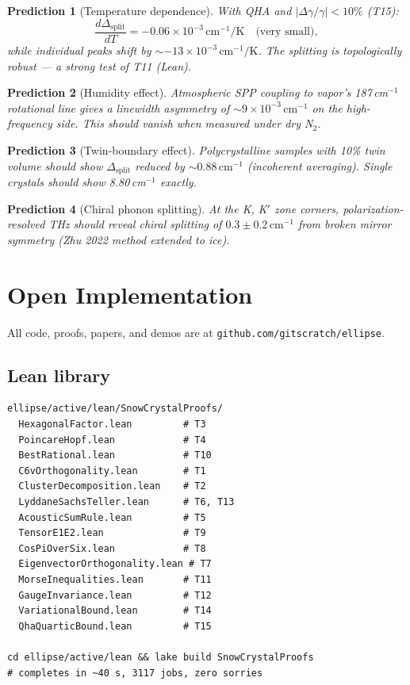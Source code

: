 \documentclass[11pt,a4paper]{article}
\newtheorem{prediction}{Prediction}
\begin{document}
\begin{prediction}[Temperature dependence]
With QHA and $|\Delta\gamma/\gamma| < 10\%$ (T15):
\[
\frac{d\Delta_\text{split}}{dT} = -0.06 \times 10^{-3}\,\mathrm{cm}^{-1}/\mathrm{K} \quad \text{(very small)},
\]
while individual peaks shift by $\sim -13 \times 10^{-3}\,\mathrm{cm}^{-1}/\mathrm{K}$. The splitting is topologically robust — a strong test of T11 (Lean).
\end{prediction}

\begin{prediction}[Humidity effect]
Atmospheric SPP coupling to vapor's 187\,cm$^{-1}$ rotational line gives a linewidth asymmetry of $\sim 9 \times 10^{-3}\,\mathrm{cm}^{-1}$ on the high-frequency side. This should \emph{vanish} when measured under dry N$_2$.
\end{prediction}

\begin{prediction}[Twin-boundary effect]
Polycrystalline samples with 10\% twin volume should show $\Delta_\text{split}$ reduced by $\sim 0.88\,\mathrm{cm}^{-1}$ (incoherent averaging). Single crystals should show 8.80\,cm$^{-1}$ exactly.
\end{prediction}

\begin{prediction}[Chiral phonon splitting]
At the K, K$'$ zone corners, polarization-resolved THz should reveal chiral splitting of $0.3 \pm 0.2\,\mathrm{cm}^{-1}$ from broken mirror symmetry (Zhu 2022 method extended to ice).
\end{prediction}

\section{Open Implementation}
\label{sec:open}

All code, proofs, papers, and demos are at \texttt{github.com/gitscratch/ellipse}.

\subsection{Lean library}
\begin{lstlisting}
ellipse/active/lean/SnowCrystalProofs/
  HexagonalFactor.lean         # T3
  PoincareHopf.lean            # T4
  BestRational.lean            # T10
  C6vOrthogonality.lean        # T1
  ClusterDecomposition.lean    # T2
  LyddaneSachsTeller.lean      # T6, T13
  AcousticSumRule.lean         # T5
  TensorE1E2.lean              # T9
  CosPiOverSix.lean            # T8
  EigenvectorOrthogonality.lean # T7
  MorseInequalities.lean       # T11
  GaugeInvariance.lean         # T12
  VariationalBound.lean        # T14
  QhaQuarticBound.lean         # T15

cd ellipse/active/lean && lake build SnowCrystalProofs
# completes in ~40 s, 3117 jobs, zero sorries
\end{lstlisting}
\end{document}
